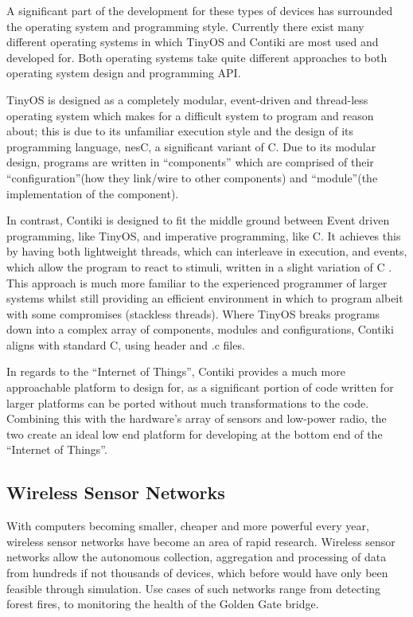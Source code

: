 A significant part of the development for these types of devices has surrounded the operating system and programming style. Currently there exist many different operating systems in which TinyOS and Contiki are most used and developed for. Both operating systems take quite different approaches to both operating system design and programming API. 

TinyOS is designed as a completely modular, event-driven and thread-less operating system which makes for a difficult system to program and reason about; this is due to its unfamiliar execution style and the design of its programming language, nesC, a significant variant of C. Due to its modular design, programs are written in ``components'' which are comprised of their ``configuration''(how they link/wire to other components) and ``module''(the implementation of the component). 

In contrast, Contiki is designed to fit the middle ground between Event driven programming, like TinyOS, and imperative programming, like C. It achieves this by having both lightweight threads, which can interleave in execution, and events, which allow the program to react to stimuli, written in a slight variation of C \cite{ContikiPaper}. This approach is much more familiar to the experienced programmer of larger systems whilst still providing an efficient environment in which to program albeit with some compromises (stackless threads). Where TinyOS breaks programs down into a complex array of components, modules and configurations, Contiki aligns with standard C, using header and .c files.

In regards to the ``Internet of Things'', Contiki provides a much more approachable platform to design for, as a significant portion of code written for larger platforms can be ported without much transformations to the code. Combining this with the hardware's array of sensors and low-power radio, the two create an ideal low end platform for developing at the bottom end of the ``Internet of Things''.

\subsection{Wireless Sensor Networks} %
\label{sec:wireless_sensor_networks}
With computers becoming smaller, cheaper and more powerful every year, wireless sensor networks have become an area of rapid research. Wireless sensor networks allow the autonomous collection, aggregation and processing of data from hundreds if not thousands of devices, which before would have only been feasible through simulation. Use cases of such networks range from detecting forest fires\cite{FireDetection}, to monitoring the health of the Golden Gate bridge\cite{GoldenGate}.

